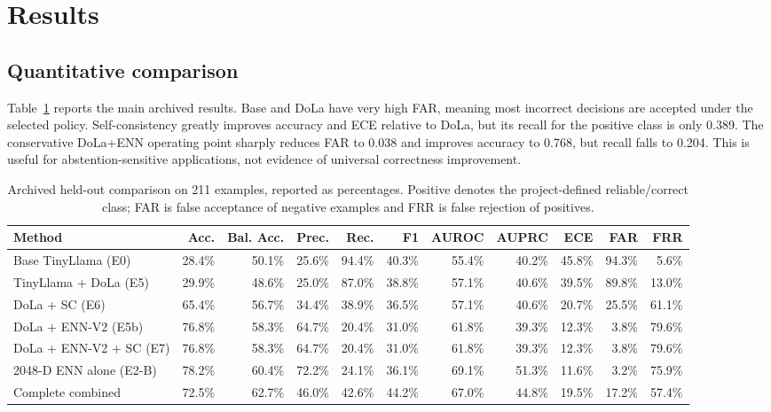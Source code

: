 \documentclass[conference]{IEEEtran}
\begin{document}
\section{Results}
\subsection{Quantitative comparison}
Table~\ref{tab:results} reports the main archived results. Base and DoLa have very high FAR, meaning most incorrect decisions are accepted under the selected policy. Self-consistency greatly improves accuracy and ECE relative to DoLa, but its recall for the positive class is only 0.389. The conservative DoLa+ENN operating point sharply reduces FAR to 0.038 and improves accuracy to 0.768, but recall falls to 0.204. This is useful for abstention-sensitive applications, not evidence of universal correctness improvement.

\begin{table}[t]\caption{Archived held-out comparison on 211 examples, reported as percentages. Positive denotes the project-defined reliable/correct class; FAR is false acceptance of negative examples and FRR is false rejection of positives.}\label{tab:results}\centering\scriptsize\begin{tabular}{lrrrrrrrrrr}\toprule
Method & Acc. & Bal. Acc. & Prec. & Rec. & F1 & AUROC & AUPRC & ECE & FAR & FRR\\\midrule
Base TinyLlama (E0) & 28.4\% & 50.1\% & 25.6\% & 94.4\% & 40.3\% & 55.4\% & 40.2\% & 45.8\% & 94.3\% & 5.6\%\\
TinyLlama + DoLa (E5) & 29.9\% & 48.6\% & 25.0\% & 87.0\% & 38.8\% & 57.1\% & 40.6\% & 39.5\% & 89.8\% & 13.0\%\\
DoLa + SC (E6) & 65.4\% & 56.7\% & 34.4\% & 38.9\% & 36.5\% & 57.1\% & 40.6\% & 20.7\% & 25.5\% & 61.1\%\\
DoLa + ENN-V2 (E5b) & 76.8\% & 58.3\% & 64.7\% & 20.4\% & 31.0\% & 61.8\% & 39.3\% & 12.3\% & 3.8\% & 79.6\%\\
DoLa + ENN-V2 + SC (E7) & 76.8\% & 58.3\% & 64.7\% & 20.4\% & 31.0\% & 61.8\% & 39.3\% & 12.3\% & 3.8\% & 79.6\%\\
2048-D ENN alone (E2-B) & 78.2\% & 60.4\% & 72.2\% & 24.1\% & 36.1\% & 69.1\% & 51.3\% & 11.6\% & 3.2\% & 75.9\%\\
Complete combined & 72.5\% & 62.7\% & 46.0\% & 42.6\% & 44.2\% & 67.0\% & 44.8\% & 19.5\% & 17.2\% & 57.4\%\\\bottomrule\end{tabular}\end{table}
\end{document}
